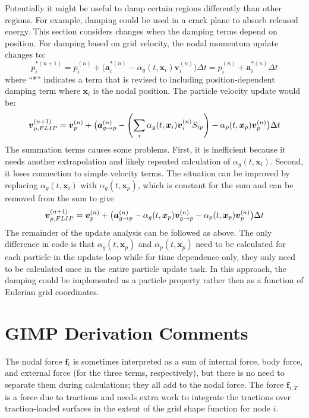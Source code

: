 \documentclass[11pt]{article}
\renewcommand{\vec}[1]{\boldsymbol{#1}}
\begin{document}
Potentially it might be useful to damp certain regions differently than other regions. For example, damping could be used in a crack plane to absorb released energy. This section considers changes when the damping terms depend on position. For damping based on grid velocity, the nodal momentum update changes to:
\begin{equation}
     p_i^{*(n+1)} = p_i^{(n)} + \bigl(\vec a_i^{*(n)}-\alpha_g(t,\vec x_i)\vec v_i^{(n)}\bigr)\Delta t = p_i^{(n)} + \vec a_i^{*(n)}\Delta t
\end{equation}
where ``*'' indicates a term that is revised to including position-dependent damping term where $\vec x_i$ is the nodal position. The particle velocity update would be:
\begin{equation}
  \vec{v}_{p,FLIP}^{(n+1)} = \vec{v}_p^{(n)} + \bigl(\vec{a}_{g\to p}^{(n)} -\left(\sum_i \alpha_g(t,\vec x_i)\vec v_i^{(n)}S_{ip}\right)  -  \alpha_p(t,\vec x_p)\vec{v}_p^{(n)} \bigr)\Delta t   \\
\end{equation}
The summation terms causes some problems. First, it is inefficient because it needs another extrapolation and likely repeated calculation of $\alpha_g(t,\vec x_i)$. Second, it loses connection to simple velocity terms. The situation can be improved by replacing $\alpha_g(t,\vec x_i)$ with $\alpha_g(t,\vec x_p)$, which is constant for the sum and can be removed from the sum to give 
\begin{equation}
  \vec{v}_{p,FLIP}^{(n+1)} = \vec{v}_p^{(n)} + \bigl(\vec{a}_{g\to p}^{(n)} - \alpha_g(t,\vec x_p)\vec v_{g\to p}^{(n)} -  \alpha_p(t,\vec x_p)\vec{v}_p^{(n)} \bigr)\Delta t   \\
\end{equation}
The remainder of the update analysis can be followed as above. The only difference in code is that $\alpha_g(t,\vec x_p)$ and $\alpha_p(t,\vec x_p)$ need to be calculated for each particle in the update loop while for time dependence only, they only need to be calculated once in the entire particle update task. In this approach, the damping could be implemented as a particle property rather then as a function of Eulerian grid coordinates.

\section{GIMP Derivation Comments}

The nodal force $\vec f_i$ is sometimes interpreted as a sum of internal force, body force, and external force (for the three terms, respectively), but there is no need to separate them during calculations; they all add to the nodal force. The force $\vec f_{i,T}$ is a force due to tractions and needs extra work to integrate the tractions over traction-loaded surfaces in the extent of the grid shape function for node $i$.
\end{document}
